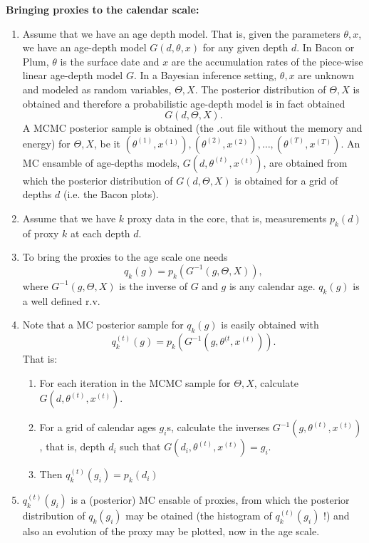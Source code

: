 \documentclass[12pt]{article}
\begin{document}
\centerline{\bf \large{Bringing proxies to the calendar scale:}}

\bigskip
\begin{enumerate}
\item Assume that we have an age depth model.  That is, given the parameters $\theta, x$, we have an age-depth model
$G( d, \theta, x)$ for any given depth $d$.  In Bacon or Plum, $\theta$ is the surface date and $x$ are the accumulation rates of the piece-wise linear age-depth model $G$. In a Bayesian inference setting, $\theta, x$ are unknown and modeled as random variables, $\Theta, X$.  The posterior distribution of $\Theta, X$ is obtained and therefore a probabilistic age-depth model is in fact obtained
$$
G( d, \Theta, X) .
$$
A MCMC posterior sample is obtained (the .out file without the memory and energy) for $\Theta, X$, be it $(\theta^{(1)}, x^{(1)}), (\theta^{(2)}, x^{(2)}), \ldots , (\theta^{(T)}, x^{(T)})$.  An MC ensamble of age-depths models, $G( d, \theta^{(t)}, x^{(t)})$, are obtained from which the posterior distribution of $G( d, \Theta, X)$ is obtained for a grid of depths $d$ (i.e. the Bacon plots).

\item Assume that we have $k$ proxy data in the core, that is, measurements $p_k(d)$ of proxy $k$ at each depth $d$.

\item To bring the proxies to the age scale one needs
$$
q_k(g) = p_k( G^{-1} ( g, \Theta, X ) ),
$$
where $G^{-1} ( g, \Theta, X )$ is the inverse of $G$ and $g$ is any calendar age.  $q_k(g)$ is a well defined r.v.

\item Note that a MC posterior sample for   $q_k(g)$ is easily obtained with
$$
q_k^{(t)}(g) = p_k( G^{-1} ( g, \theta^{(t}, x^{(t)} ) ).
$$
That is:
\begin{enumerate}
\item For each iteration in the MCMC sample for $\Theta, X$, calculate $G( d, \theta^{(t)}, x^{(t)})$.
\item For a grid of calendar ages $g_i$s, calculate the inverses $G^{-1} ( g, \theta^{(t)}, x^{(t)} )$, that is,
depth $d_i$ such that $G( d_i, \theta^{(t)}, x^{(t)}) = g_i$.
\item Then $q_k^{(t)}(g_i) = p_k(d_i)$
\end{enumerate}

\item $q_k^{(t)}(g_i)$ is a (posterior) MC ensable of proxies, from which the posterior distribution of $q_k(g_i)$ may be otained (the histogram of $q_k^{(t)}(g_i)$ !) and also an evolution of the proxy may be plotted, now in the age scale.

\end{enumerate} 
\end{document}
